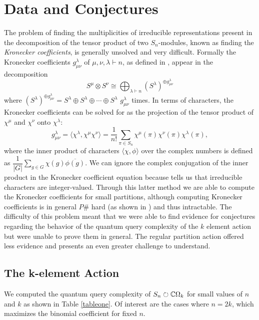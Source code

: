 \documentclass[12pt,twoside]{reedthesis}
\theoremstyle{plain}   %
\theoremstyle{definition}
\theoremstyle{remark}
\numberwithin{equation}{section}
\def\acts{\circlearrowright} %
\begin{document}
  \section{Data and Conjectures}
  The problem of finding the multiplicities of irreducible representations present in the decomposition of the tensor product of two $S_n$-modules, known as finding the \emph{Kronecker coefficients},
  is generally unsolved and very difficult. Formally the Kronecker coefficients $g^\lambda_{\mu \nu}$ of $\mu, \nu, \lambda \vdash n$, as defined in \cite[Definition 2.4.1]{wang2021}, appear in the decomposition
  \[ S^\mu \otimes S^\nu \cong \bigoplus_{\lambda \vdash n}  (S^\lambda)^{\oplus g^\lambda_{\mu \nu}}\]
  where $(S^\lambda)^{\oplus g^\lambda_{\mu \nu}} = S^\lambda \oplus S^\lambda \oplus \cdots \oplus S^\lambda $ $g^\lambda_{\mu \nu}$ times.
  In terms of characters, the Kronecker coefficients can be solved for as the projection of the tensor product of $\chi^\mu$ and $\chi^\nu$ onto $\chi^\lambda$:
  \[ g^\lambda_{\mu \nu} = \langle \chi^{\lambda} , \chi^\mu \chi^{\nu} \rangle = \dfrac{1}{n!} \sum_{\pi \in S_n} \chi^\mu(\pi) \chi^\nu(\pi) \chi^\lambda (\pi),\]
  where the inner product of characters $\langle \chi, \phi \rangle$ over the complex numbers is defined as $\dfrac{1}{|G|} \sum_{g \in G} \chi(g) \overline{\phi(g)}$. We can ignore the complex conjugation of the inner product
  in the Kronecker coefficient equation
  because \cite[Exercise 2.6]{sagan} tells us that irreducible characters are integer-valued.
  Through this latter method we are able to compute the Kronecker coefficients for small partitions, although computing Kronecker coefficients is in general $P\#$ hard (as shown in \cite[Theorem 1]{burgisser2008}) and thus intractable.
  The difficulty of this problem meant that we were able to find evidence for conjectures regarding the behavior of the quantum query complexity of the $k$ element action but were unable to prove them in general.
  The regular partition action offered less evidence and presents an even greater challenge to understand.
  \subsection{The k-element Action}
  We computed the quantum query complexity of $S_n \acts \CC \Omega_k$ for small values of $n$ and $k$ as shown in Table \ref{tableone}. Of interest are the cases where $n = 2k$, which maximizes the binomial coefficient for fixed $n$.
\end{document}
